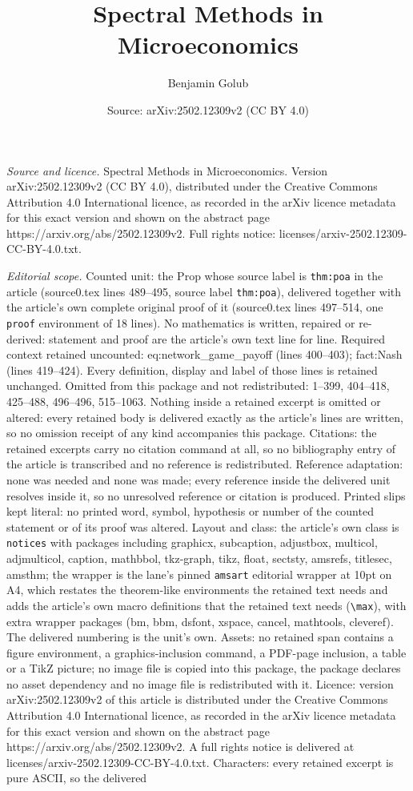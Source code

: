 \documentclass[10pt,a4paper]{amsart}
\title[Spectral Methods in Microeconomics]{Spectral Methods in Microeconomics}
\author{Benjamin Golub}
\date{Source: arXiv:2502.12309v2 (CC BY 4.0)}
\begin{document}
\maketitle

\noindent\emph{Source and licence.} Spectral Methods in Microeconomics. Version arXiv:2502.12309v2 (CC BY 4.0), distributed under the Creative Commons Attribution 4.0 International licence, as recorded in the arXiv licence metadata for this exact version and shown on the abstract page https://arxiv.org/abs/2502.12309v2. Full rights notice: licenses/arxiv-2502.12309-CC-BY-4.0.txt.\par\smallskip

\noindent\textit{Editorial scope.} Counted unit: the Prop whose source label is \texttt{thm:poa} in the article (source0.tex lines 489--495, source label \texttt{thm:poa}), delivered together with the article's own complete original proof of it (source0.tex lines 497--514, one \texttt{proof} environment of 18 lines). No mathematics is written, repaired or re-derived: statement and proof are the article's own text line for line. Required context retained uncounted: eq:network\_game\_payoff (lines 400--403); fact:Nash (lines 419--424). Every definition, display and label of those lines is retained unchanged. Omitted from this package and not redistributed: 1--399, 404--418, 425--488, 496--496, 515--1063. Nothing inside a retained excerpt is omitted or altered: every retained body is delivered exactly as the article's lines are written, so no omission receipt of any kind accompanies this package. Citations: the retained excerpts carry no citation command at all, so no bibliography entry of the article is transcribed and no reference is redistributed. Reference adaptation: none was needed and none was made; every reference inside the delivered unit resolves inside it, so no unresolved reference or citation is produced. Printed slips kept literal: no printed word, symbol, hypothesis or number of the counted statement or of its proof was altered. Layout and class: the article's own class is \texttt{notices} with packages including graphicx, subcaption, adjustbox, multicol, adjmulticol, caption, mathbbol, tkz-graph, tikz, float, sectsty, amsrefs, titlesec, amsthm; the wrapper is the lane's pinned \texttt{amsart} editorial wrapper at 10pt on A4, which restates the theorem-like environments the retained text needs and adds the article's own macro definitions that the retained text needs (\texttt{\textbackslash max}), with extra wrapper packages (bm, bbm, dsfont, xspace, cancel, mathtools, cleveref). The delivered numbering is the unit's own. Assets: no retained span contains a figure environment, a graphics-inclusion command, a PDF-page inclusion, a table or a TikZ picture; no image file is copied into this package, the package declares no asset dependency and no image file is redistributed with it. Licence: version arXiv:2502.12309v2 of this article is distributed under the Creative Commons Attribution 4.0 International licence, as recorded in the arXiv licence metadata for this exact version and shown on the abstract page https://arxiv.org/abs/2502.12309v2. A full rights notice is delivered at licenses/arxiv-2502.12309-CC-BY-4.0.txt. Characters: every retained excerpt is pure ASCII, so the delivered 
\end{document}
